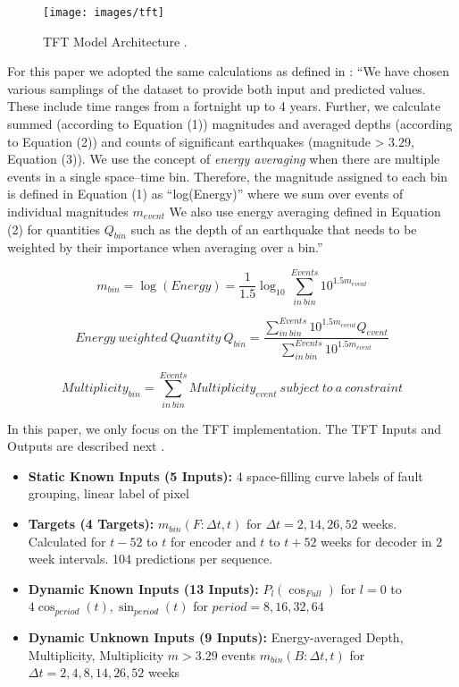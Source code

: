\begin{figure}[htb]
    \centering\texttt{[image: images/tft]}
    \caption{TFT Model Architecture \citep{fox2022-jm}.}
    \label{fig:TFT_Model_Arch}
\end{figure}


For this paper we adopted the same calculations as defined in \cite{fox2022-jm}: ``We have chosen various samplings of the dataset to provide both input and predicted values. These include time ranges from a fortnight up to 4 years. Further, we calculate summed (according to Equation (1)) magnitudes and averaged depths (according to Equation (2)) and counts of significant earthquakes (magnitude > 3.29, Equation (3)).  We use the concept of {\em energy averaging} when there are multiple events in a single space–time bin. Therefore, the magnitude assigned to each bin is defined in Equation (1) as “log(Energy)” where we sum over events of individual magnitudes $m_{event}$ We also use energy averaging defined in Equation (2) for quantities $Q_{bin}$ such as the depth of an earthquake that needs to be weighted by their importance when averaging over a bin.''

\begin{equation}
m_{bin} = \log(Energy) = \frac{1}{1.5}\log_{10}\sum_{in~bin}^{Events}10^{1.5m_{event}}
\end{equation}

\begin{equation}
Energy~weighted~Quantity~Q_{bin} = \frac{\displaystyle
   \sum^{Events}_{in~bin} 10^{1.5m_{event}} Q_{event}}{\displaystyle \sum^{Events}_{in~bin}10^{1.5m_{event}}}
\end{equation}

\begin{equation}
Multiplicity_{bin} = \sum^{Events}_{in~bin}Multiplicity_{event} ~ subject~to~a~constraint
\end{equation}


In this paper, we only focus on the TFT implementation. The TFT Inputs and Outputs are described next \cite{fox2022-jm}.

\begin{itemize}
\item {\bf Static Known Inputs (5 Inputs):} 4 space-filling curve
  labels of fault grouping, linear label of pixel
  \item {\bf Targets (4 Targets):} $m_{bin} (F:\Delta t,t)$ for $\Delta t = 2, 14, 26, 52$ weeks. Calculated for $t-52$ to $t$ for encoder and $t$ to $t+52$ weeks for decoder in $2$ week intervals. 104 predictions per sequence.
  \item {\bf Dynamic Known Inputs (13 Inputs):} $P_l(\cos_{Full})$ for $l=0$ to $4 \cos_{period}(t), \sin_{period}(t)$  for $period = 8, 16, 32, 64$
  \item {\bf Dynamic Unknown Inputs (9 Inputs):} Energy-averaged Depth, Multiplicity, Multiplicity  $m>3.29$ events $m_{bin} (B:\Delta t,t)$ for $\Delta t = 2, 4, 8, 14, 26, 52$ weeks
\end{itemize}


